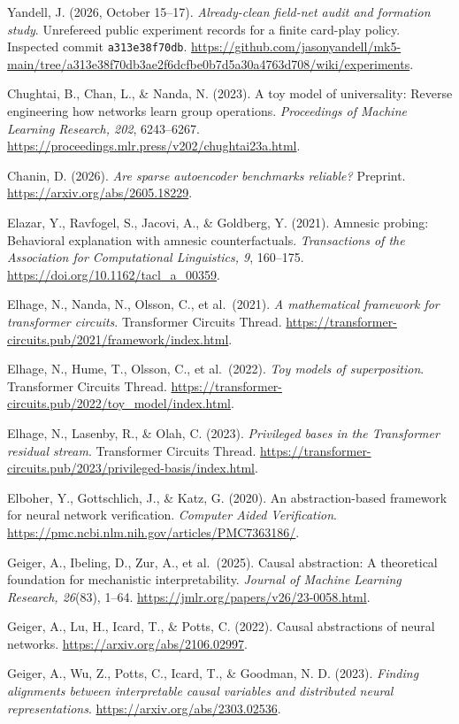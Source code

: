 \documentclass[
  british,
  11pt,
  a4paper,
]{article}
\begin{document}
Yandell, J. (2026, October 15--17). \emph{Already-clean field-net audit
and formation study}. Unrefereed public experiment records for a finite
card-play policy. Inspected commit \texttt{a313e38f70db}.
\url{https://github.com/jasonyandell/mk5-main/tree/a313e38f70db3ae2f6dcfbe0b7d5a30a4763d708/wiki/experiments}.

Chughtai, B., Chan, L., \& Nanda, N. (2023). A toy model of
universality: Reverse engineering how networks learn group operations.
\emph{Proceedings of Machine Learning Research, 202}, 6243--6267.
\url{https://proceedings.mlr.press/v202/chughtai23a.html}.

Chanin, D. (2026). \emph{Are sparse autoencoder benchmarks reliable?}
Preprint. \url{https://arxiv.org/abs/2605.18229}.

Elazar, Y., Ravfogel, S., Jacovi, A., \& Goldberg, Y. (2021). Amnesic
probing: Behavioral explanation with amnesic counterfactuals.
\emph{Transactions of the Association for Computational Linguistics, 9},
160--175. \url{https://doi.org/10.1162/tacl_a_00359}.

Elhage, N., Nanda, N., Olsson, C., et al.~(2021). \emph{A mathematical
framework for transformer circuits}. Transformer Circuits Thread.
\url{https://transformer-circuits.pub/2021/framework/index.html}.

Elhage, N., Hume, T., Olsson, C., et al.~(2022). \emph{Toy models of
superposition}. Transformer Circuits Thread.
\url{https://transformer-circuits.pub/2022/toy_model/index.html}.

Elhage, N., Lasenby, R., \& Olah, C. (2023). \emph{Privileged bases in
the Transformer residual stream}. Transformer Circuits Thread.
\url{https://transformer-circuits.pub/2023/privileged-basis/index.html}.

Elboher, Y., Gottschlich, J., \& Katz, G. (2020). An abstraction-based
framework for neural network verification. \emph{Computer Aided
Verification}. \url{https://pmc.ncbi.nlm.nih.gov/articles/PMC7363186/}.

Geiger, A., Ibeling, D., Zur, A., et al.~(2025). Causal abstraction: A
theoretical foundation for mechanistic interpretability. \emph{Journal
of Machine Learning Research, 26}(83), 1--64.
\url{https://jmlr.org/papers/v26/23-0058.html}.

Geiger, A., Lu, H., Icard, T., \& Potts, C. (2022). Causal abstractions
of neural networks. \url{https://arxiv.org/abs/2106.02997}.

Geiger, A., Wu, Z., Potts, C., Icard, T., \& Goodman, N. D. (2023).
\emph{Finding alignments between interpretable causal variables and
distributed neural representations}.
\url{https://arxiv.org/abs/2303.02536}.
\end{document}
